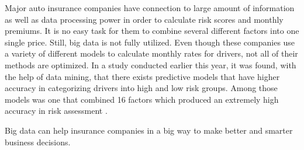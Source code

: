 Major auto insurance companies have connection to large amount of information as well as data processing power in order to calculate risk scores and monthly premiums. It is no easy task for them to combine several different factors into one single price. Still, big data is not fully utilized. Even though these companies use a variety of different models to calculate monthly rates for drivers, not all of their methods are optimized. In a study conducted earlier this year, it was found, with the help of data mining, that there exists predictive models that have higher accuracy in categorizing drivers into high and low risk groups. Among those models was one that combined 16 factors which produced an extremely high accuracy in risk assessment \cite{Rippe2017unfair}.

Big data can help insurance companies in a big way to make better and smarter business decisions. 

